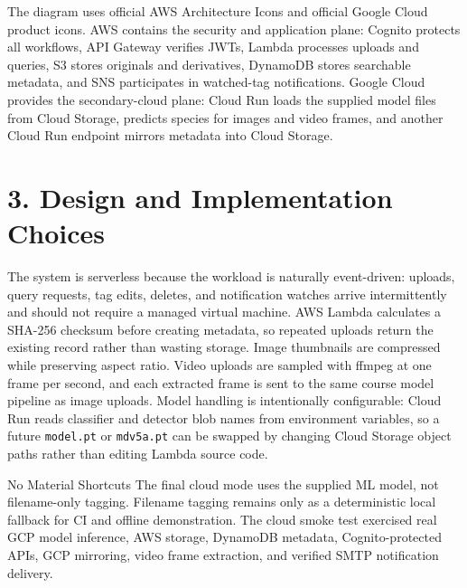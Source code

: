 \documentclass[12pt,a4paper]{article}
\begin{document}
\begin{landscape}
\vspace{2mm}
\begin{minipage}{0.94\linewidth}
\small The diagram uses official AWS Architecture Icons and official Google Cloud product icons. AWS contains the security and application plane: Cognito protects all workflows, API Gateway verifies JWTs, Lambda processes uploads and queries, S3 stores originals and derivatives, DynamoDB stores searchable metadata, and SNS participates in watched-tag notifications. Google Cloud provides the secondary-cloud plane: Cloud Run loads the supplied model files from Cloud Storage, predicts species for images and video frames, and another Cloud Run endpoint mirrors metadata into Cloud Storage.
\end{minipage}
\end{landscape}
\newpage

\section*{3. Design and Implementation Choices}
The system is serverless because the workload is naturally event-driven: uploads, query requests, tag edits, deletes, and notification watches arrive intermittently and should not require a managed virtual machine. AWS Lambda calculates a SHA-256 checksum before creating metadata, so repeated uploads return the existing record rather than wasting storage. Image thumbnails are compressed while preserving aspect ratio. Video uploads are sampled with ffmpeg at one frame per second, and each extracted frame is sent to the same course model pipeline as image uploads. Model handling is intentionally configurable: Cloud Run reads classifier and detector blob names from environment variables, so a future \texttt{model.pt} or \texttt{mdv5a.pt} can be swapped by changing Cloud Storage object paths rather than editing Lambda source code.

\begin{summarybox}{No Material Shortcuts}
The final cloud mode uses the supplied ML model, not filename-only tagging. Filename tagging remains only as a deterministic local fallback for CI and offline demonstration. The cloud smoke test exercised real GCP model inference, AWS storage, DynamoDB metadata, Cognito-protected APIs, GCP mirroring, video frame extraction, and verified SMTP notification delivery.
\end{summarybox}
\end{document}
